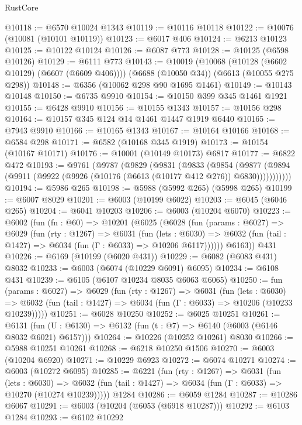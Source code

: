 \begin{lexlean}{RustCore}
\begin{coremodule}
@10118 := @6570 @10024 @1343
@10119 := @10116 @10118
@10122 := @10076 (@10081 (@10101 @10119))
@10123 := @6017 @406
@10124 := @6213 @10123
@10125 := @10122 @10124
@10126 := @6087 @773
@10128 := @10125 (@6598 @10126)
@10129 := @6111 @773
@10143 := @10019
    (@10068 (@10128 (@6602 @10129) (@6607 (@6609 @406))))
    (@6688 (@10050 @34))
    (@6613 (@10055 @275 @298))
@10148 := @6356 (@10062 @298 @90 @1695 @1461)
@10149 := @10143 @10148
@10150 := @6735 @9910
@10154 := @10150 @399 @345 @1461 @1921
@10155 := @6428 @9910
@10156 := @10155 @1343
@10157 := @10156 @298
@10164 := @10157 @345 @124 @14 @1461 @1447 @1919 @6440
@10165 := @7943 @9910
@10166 := @10165 @1343
@10167 := @10164 @10166
@10168 := @6584 @298
@10171 := @6582 (@10168 @345 @1919)
@10173 := @10154 (@10167 @10171)
@10176 := @10001 (@10149 @10173) @6817
@10177 := @6822 @472
@10193 := @9761
    (@9787
      (@9829
        (@9831
          (@9833
            (@9854
              (@9877 (@9894 (@9911 (@9922 (@9926 (@10176 (@6613 (@10177 @412 @276)) @6830)))))))))))
@10194 := @5986 @265
@10198 := @5988 (@5992 @265) (@5998 @265)
@10199 := @6007 @8029
@10201 := @6003 (@10199 @6022)
@10203 := @6045 (@6046 @265)
@10204 := @6041 @10203
@10206 := @6003 (@10204 @6070)
@10223 := @6002
    (fun (fn : @60) =>
    @10201
      (@6025
        (@6028
          (fun (params : @6027) =>
          @6029
            (fun (rty : @1267) =>
            @6031
              (fun (lets : @6030) =>
              @6032 (fun (tail : @1427) => @6034 (fun (Γ : @6033) => @10206 @6117))))))
        @6163))
    @431
@10226 := @6169 (@10199 (@6020 @431))
@10229 := @6082 (@6083 @431) @8032
@10233 := @6003 (@6074 (@10229 @6091) @6095)
@10234 := @6108 @431
@10239 := @6105 (@6107 @10234 @8035 @6063 @6065)
@10250 := fun (params : @6027) =>
  @6029
    (fun (rty : @1267) =>
    @6031
      (fun (lets : @6030) =>
      @6032 (fun (tail : @1427) => @6034 (fun (Γ : @6033) => @10206 (@10233 @10239)))))
@10251 := @6028 @10250
@10252 := @6025 @10251
@10261 := @6131 (fun (U : @6130) => @6132 (fun (t : @7) => @6140 (@6003 (@6146 @8032 @6021) @6157)))
@10264 := @10226 (@10252 @10261) @8030
@10266 := @5988 @10251 @10261
@10268 := @6218 @10250 @1506
@10270 := @6003 (@10204 @6920)
@10271 := @10229 @6923
@10272 := @6074 @10271
@10274 := @6003 (@10272 @6095)
@10285 := @6221
    (fun (rty : @1267) =>
    @6031
      (fun (lets : @6030) =>
      @6032 (fun (tail : @1427) => @6034 (fun (Γ : @6033) => @10270 (@10274 @10239)))))
    @1284
@10286 := @6059 @1284
@10287 := @10286 @6067
@10291 := @6003 (@10204 (@6053 (@6918 @10287)))
@10292 := @6103 @1284
@10293 := @6102 @10292

\end{coremodule}
\end{lexlean}
